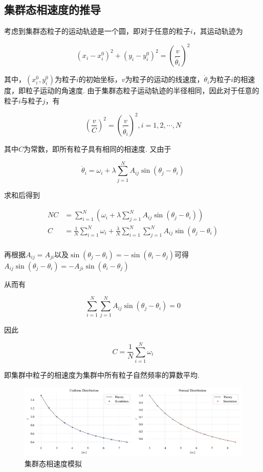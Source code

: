 \documentclass{article}
\begin{document}
\subsection{集群态相速度的推导}

考虑到集群态粒子的运动轨迹是一个圆，即对于任意的粒子$i$，其运动轨迹为

$$
\left( x_i-x_{i}^{0} \right) ^2+\left( y_i-y_{i}^{0} \right) ^2=\left( \frac{v}{\dot{\theta}_i} \right) ^2
$$

其中，$\left( x_{i}^{0},y_{i}^{0} \right)$为粒子$i$的初始坐标，$v$为粒子的运动的线速度，$\dot{\theta}_i$为粒子$i$的相速度，即粒子运动的角速度. 由于集群态粒子运动轨迹的半径相同，因此对于任意的粒子$i$与粒子$j$，有

$$
\left( \frac{v}{C} \right) ^2=\left( \frac{v}{\dot{\theta}_i} \right) ^2,i=1,2,\cdots ,N
$$

其中$C$为常数，即所有粒子具有相同的相速度. 又由于

$$
\dot{\theta}_i=\omega _i+\lambda \sum_{j=1}^N{A_{ij}\sin \left( \theta _j-\theta _i \right)}
$$

求和后得到

$$
\begin{aligned}
	NC&=\sum_{i=1}^N{\left( \omega _i+\lambda \sum_{j=1}^N{A_{ij}\sin \left( \theta _j-\theta _i \right)} \right)}\\
	C&=\frac{1}{N}\sum_{i=1}^N{\omega _i}+\frac{\lambda}{N}\sum_{i=1}^N{\sum_{j=1}^N{A_{ij}\sin \left( \theta _j-\theta _i \right)}}\\
\end{aligned}
$$

再根据$A_{ij}=A_{ji}$以及$\sin \left( \theta _j-\theta _i \right)=-\sin \left( \theta _i-\theta _j \right)$可得$
A_{ij}\sin \left( \theta _j-\theta _i \right) =-A_{ji}\sin \left( \theta _i-\theta _j \right) 
$

从而有

$$
\sum_{i=1}^N{\sum_{j=1}^N{A_{ij}\sin \left( \theta _j-\theta _i \right)}}=0
$$

因此

$$
C=\frac{1}{N}\sum_{i=1}^N{\omega _i}
$$


即集群中粒子的相速度为集群中所有粒子自然频率的算数平均.

\begin{figure}[H]
	\centering
	\includegraphics[width=\textwidth]{./figs/swarmRadiusSimu.png}
	\vspace{-1cm}
	\caption{集群态相速度模拟}
	\label{fig:fig22}
\end{figure}
\end{document}
